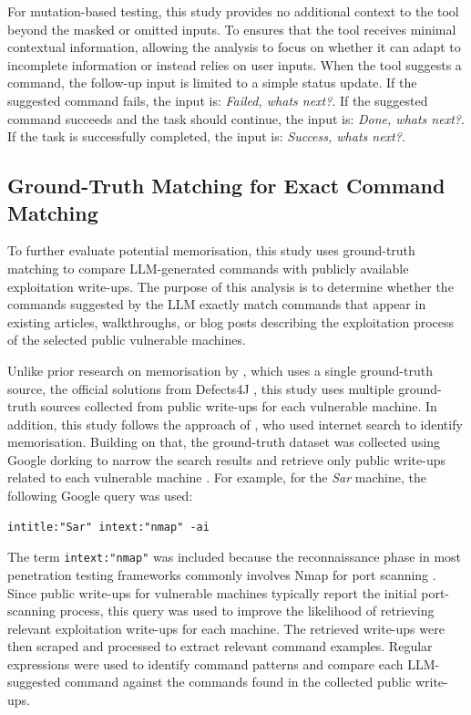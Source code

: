 \documentclass[acmtog]{acmart}
\begin{document}
For mutation-based testing, this study provides no additional context to the tool beyond the masked or omitted inputs. To ensures that the tool receives minimal contextual information, allowing the analysis to focus on whether it can adapt to incomplete information or instead relies on user inputs. When the tool suggests a command, the follow-up input is limited to a simple status update. If the suggested command fails, the input is: \textit{Failed, whats next?}. If the suggested command succeeds and the task should continue, the input is: \textit{Done, whats next?}. If the task is successfully completed, the input is: \textit{Success, whats next?}.

\subsection{Ground-Truth Matching for Exact Command Matching}

To further evaluate potential memorisation, this study uses ground-truth matching to compare LLM-generated commands with publicly available exploitation write-ups. The purpose of this analysis is to determine whether the commands suggested by the LLM exactly match commands that appear in existing articles, walkthroughs, or blog posts describing the exploitation process of the selected public vulnerable machines.

Unlike prior research on memorisation by \citet{kong_demystifying_2025}, which uses a single ground-truth source, the official solutions from Defects4J \cite{just_defects4j_2014}, this study uses multiple ground-truth sources collected from public write-ups for each vulnerable machine. In addition, this study follows the approach of \citet{carlini_extracting_2021}, who used internet search to identify memorisation. Building on that, the ground-truth dataset was collected using Google dorking to narrow the search results and retrieve only public write-ups related to each vulnerable machine \cite{long_google_2016}. For example, for the \textit{Sar} machine, the following Google query was used:

\begin{verbatim}
intitle:"Sar" intext:"nmap" -ai
\end{verbatim}

The term \texttt{intext:"nmap"} was included because the reconnaissance phase in most penetration testing frameworks commonly involves Nmap for port scanning \cite{adam_review_pentest_framework_2023}. Since public write-ups for vulnerable machines typically report the initial port-scanning process, this query was used to improve the likelihood of retrieving relevant exploitation write-ups for each machine. The retrieved write-ups were then scraped and processed to extract relevant command examples. Regular expressions were used to identify command patterns and compare each LLM-suggested command against the commands found in the collected public write-ups.
\end{document}
